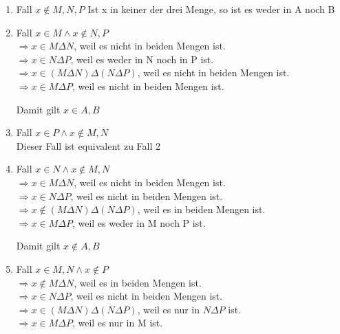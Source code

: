 \documentclass{article}
\begin{document}
        \begin{enumerate}
            \item Fall \( x \notin M, N, P \)
            Ist x in keiner der drei Menge, so ist es weder in A noch B 

            \item Fall \(x \in M \land x \notin N, P\) \\
            \(\Rightarrow x \in M \Delta N \), weil es nicht in beiden Mengen ist. \\
            \(\Rightarrow x \in N \Delta P \), weil es weder in N noch in P ist. \\
            \(\Rightarrow x \in ( M \Delta N )\Delta(N \Delta P ) \), weil es nicht in beiden Mengen ist. \\
            \(\Rightarrow x \in M \Delta P \), weil es nicht in beiden Mengen ist.

            Damit gilt \(x \in A, B \)

            \item Fall \(x \in P \land x \notin M, N\) \\
            Dieser Fall ist equivalent zu Fall 2
            
            \item Fall \(x \in N \land x \notin M, N \) \\
            \(\Rightarrow x \in M \Delta N \), weil es nicht in beiden Mengen ist. \\
            \(\Rightarrow x \in N \Delta P \), weil es nicht in beiden Mengen ist. \\
            \(\Rightarrow x \notin ( M \Delta N )\Delta(N \Delta P ) \), weil es in beiden Mengen ist. \\
            \(\Rightarrow x \in M \Delta P \), weil es weder in M noch P ist.

            Damit gilt \(x \notin A, B \) 

            \item Fall \(x \in M, N \land x \notin P \) \\
            \(\Rightarrow x \notin M \Delta N \), weil es in beiden Mengen ist. \\
            \(\Rightarrow x \in N \Delta P \), weil es nicht in beiden Mengen ist. \\
            \(\Rightarrow x \in ( M \Delta N )\Delta(N \Delta P ) \), weil es nur in \(N \Delta P\) ist. \\
            \(\Rightarrow x \in M \Delta P \), weil es nur in M ist.


\end{enumerate}
\end{document}
